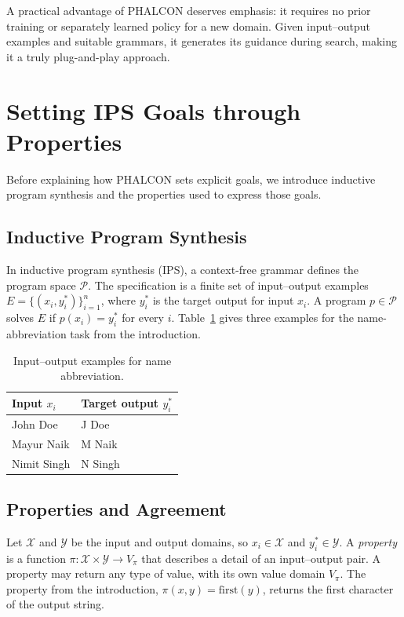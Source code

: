\documentclass[letterpaper]{article} %
\begin{document}
A practical advantage of PHALCON deserves emphasis: it requires no
prior training or separately learned policy for a new domain. Given
input--output examples and suitable grammars, it generates its guidance
during search, making it a truly plug-and-play approach.

\section{Setting IPS Goals through Properties}
\label{sec:behavioral-goals}

Before explaining how PHALCON sets explicit goals, we introduce
inductive program synthesis and the properties used to express those
goals.

\subsection{Inductive Program Synthesis}
In inductive program synthesis (IPS), a context-free grammar defines
the program space \(\mathcal{P}\). The specification is a finite set
of input--output examples \(E=\{(x_i,y_i^*)\}_{i=1}^{n}\), where
\(y_i^*\) is the target output for input \(x_i\).
A program \(p\in\mathcal{P}\) solves \(E\) if \(p(x_i)=y_i^*\)
for every \(i\). Table~\ref{tab:abbreviation-examples} gives three
examples for the name-abbreviation task from the introduction.

\begin{table}[hb]
  \centering
  \begin{tabular}{ll}
    \toprule
    Input \(x_i\) & Target output \(y_i^*\) \\
    \midrule
    John Doe & J Doe \\
    Mayur Naik & M Naik \\
    Nimit Singh & N Singh \\
    \bottomrule
  \end{tabular}
  \caption{Input--output examples for name abbreviation.}
  \label{tab:abbreviation-examples}
\end{table}

\subsection{Properties and Agreement}
Let \(\mathcal{X}\) and \(\mathcal{Y}\) be the input and output
domains, so \(x_i\in\mathcal{X}\) and \(y_i^*\in\mathcal{Y}\).
A \emph{property} is a function
\(\pi\colon\mathcal{X}\times\mathcal{Y}\to V_\pi\) that describes
a detail of an input--output pair. A property may return any type of
value, with its own value domain \(V_\pi\). The property from the
introduction, \(\pi(x,y)=\mathrm{first}(y)\), returns the first
character of the output string.
\end{document}
